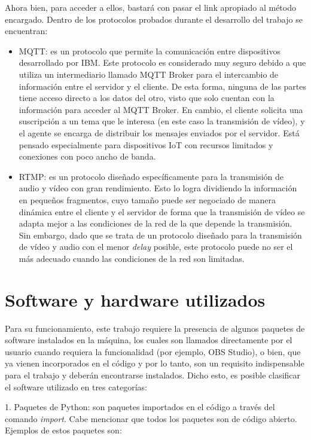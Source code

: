 Ahora bien, para acceder a ellos, bastará con pasar el link apropiado al método encargado. Dentro de los protocolos probados durante el desarrollo del trabajo se encuentran:

\begin{itemize}
	\item MQTT: es un protocolo que permite la comunicación entre dispositivos desarrollado por IBM. Este protocolo es considerado muy seguro debido a que utiliza un intermediario llamado MQTT Broker para el intercambio de información entre el servidor y el cliente. De esta forma, ninguna de las partes tiene acceso directo a los datos del otro, visto que solo cuentan con la información para acceder al MQTT Broker. En cambio, el cliente solicita una suscripción a un tema que le interesa (en este caso la transmisión de vídeo), y el agente se encarga de distribuir los mensajes enviados por el servidor. Está pensado especialmente para dispositivos IoT con recursos limitados y conexiones con poco ancho de banda. 
	\item RTMP: es un protocolo diseñado específicamente para la transmisión de audio y vídeo con gran rendimiento. Esto lo logra dividiendo la información en pequeños fragmentos, cuyo tamaño puede ser negociado de manera dinámica entre el cliente y el servidor de forma que la transmisión de vídeo se adapta mejor a las condiciones de la red de la que depende la transmisión. Sin embargo, dado que se trata de un protocolo diseñado para la transmisión de vídeo y audio con el menor \textit{delay} posible, este protocolo puede no ser el más adecuado cuando las condiciones de la red son limitadas. 
\end{itemize}

\section{Software y hardware utilizados} 

Para su funcionamiento, este trabajo requiere la presencia de algunos paquetes de software instalados en la máquina, los cuales son llamados directamente por el usuario cuando requiera la funcionalidad (por ejemplo, OBS Studio), o bien, que ya vienen incorporados en el código y por lo tanto, son un requisito indispensable para el trabajo y deberán encontrarse instalados. Dicho esto, es posible clasificar el software utilizado en tres categorías:


1. Paquetes de Python: son paquetes importados en el código a través del comando \textit{import}. Cabe mencionar que todos los paquetes son de código abierto. Ejemplos de estos paquetes son:
 
